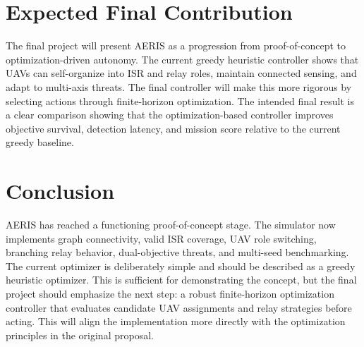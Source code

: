 \documentclass[conference]{IEEEtran}
\begin{document}
\section{Expected Final Contribution}
The final project will present AERIS as a progression from proof-of-concept to
optimization-driven autonomy. The current greedy heuristic controller shows that
UAVs can self-organize into ISR and relay roles, maintain connected sensing, and
adapt to multi-axis threats. The final controller will make this more rigorous
by selecting actions through finite-horizon optimization. The intended final
result is a clear comparison showing that the optimization-based controller
improves objective survival, detection latency, and mission score relative to
the current greedy baseline.

\section{Conclusion}
AERIS has reached a functioning proof-of-concept stage. The simulator now
implements graph connectivity, valid ISR coverage, UAV role switching,
branching relay behavior, dual-objective threats, and multi-seed benchmarking.
The current optimizer is deliberately simple and should be described as a
greedy heuristic optimizer. This is sufficient for demonstrating the concept,
but the final project should emphasize the next step: a robust finite-horizon
optimization controller that evaluates candidate UAV assignments and relay
strategies before acting. This will align the implementation more directly with
the optimization principles in the original proposal.
\end{document}
